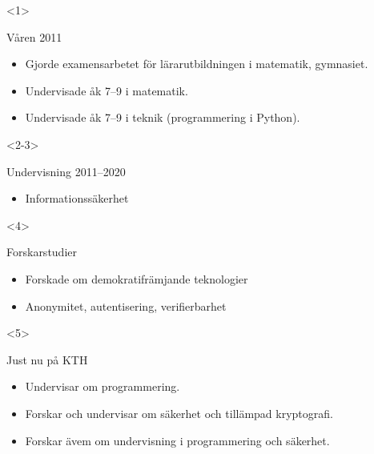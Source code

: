 \begin{frame}
  \begin{onlyenv}<1>
    \begin{exampleblock}{Våren 2011}
      \begin{itemize}
        \item Gjorde examensarbetet för lärarutbildningen i matematik, 
          gymnasiet.
        \item Undervisade åk 7--9 i matematik.
        \item Undervisade åk 7--9 i teknik (programmering i Python).
      \end{itemize}
    \end{exampleblock}
  \end{onlyenv}
  \begin{onlyenv}<2-3>
    \begin{exampleblock}{Undervisning 2011--2020}
      \begin{itemize}
        \item Informationssäkerhet
      \end{itemize}
    \end{exampleblock}
  \end{onlyenv}
  \begin{onlyenv}<4>
    \begin{exampleblock}{Forskarstudier}
      \begin{itemize}
        \item Forskade om demokratifrämjande teknologier
        \item Anonymitet, autentisering, verifierbarhet
      \end{itemize}
    \end{exampleblock}
  \end{onlyenv}
  \begin{onlyenv}<5>
    \begin{exampleblock}{Just nu på KTH}
      \begin{itemize}
        \item Undervisar om programmering.
        \item Forskar och undervisar om säkerhet och tillämpad kryptografi.
        \item Forskar ävem om undervisning i programmering och säkerhet.
      \end{itemize}
    \end{exampleblock}
  \end{onlyenv}
\end{frame}


